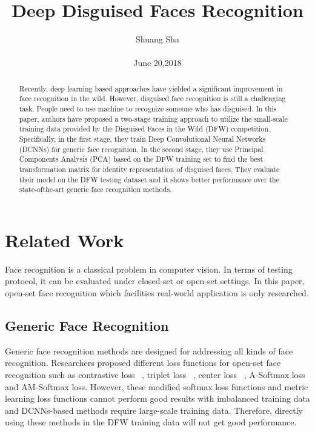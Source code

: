 \documentclass[10pt,twocolumn,letterpaper]{article}
\begin{document}
\title{Deep Disguised Faces Recognition}

\author{Shuang Sha \\\\ June 20,2018}

\maketitle

\begin{abstract}
  Recently, deep learning based approaches have yielded a significant improvement in face recognition in the wild. However, disguised face recognition is still a challenging task. People need to use machine to recognize someone who has disguised. In this paper, authors have proposed a two-stage training approach to utilize the small-scale training data provided by the Disguised Faces in the Wild (DFW) competition. Specifically, in the first stage, they train Deep Convolutional Neural Networks (DCNNs) for generic face recognition. In the second stage, they use Principal Components Analysis (PCA) based on the DFW training set to find the best transformation matrix for identity representation of disguised faces. They evaluate their model on the DFW testing dataset and it shows better performance over the state-ofthe-art generic face recognition methods.
\end{abstract}

\section{Related Work}

Face recognition is a classical problem in computer vision. In terms of testing protocol, it can be evaluated under closed-set or open-set settings. In this paper, open-set face recognition which facilities real-world application is only researched.


\subsection{Generic Face Recognition}

Generic face recognition methods are designed for addressing all kinds of face recognition. Researchers proposed different loss functions for open-set face recognition such as contrastive loss ~\cite{Sun2015Deeply}, triplet loss ~\cite{Schroff2015FaceNet}, center loss ~\cite{Wen2016A}, A-Softmax loss and AM-Softmax loss. However, these modified softmax loss functions and metric learning loss functions cannot perform good results with imbalanced training data and DCNNs-based methods require large-scale training data. Therefore, directly using these methods in the DFW training data will not get good performance.
\end{document}
